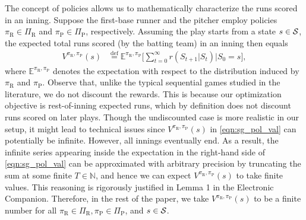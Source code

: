 \documentclass[opre,dblanonrev]{informs4}
\newcommand{\defeq}{\stackrel{\text{def}}{=}}
\begin{document}
    The concept of policies allows us to mathematically characterize the runs scored in an inning. Suppose the first-base runner and the pitcher employ policies $\pi_\text{R} \in \Pi_\text{R}$ and $\pi_\text{P} \in \Pi_\text{P}$, respectively. Assuming the play starts from a state $s \in {\cal S}$, the expected total runs scored (by the batting team) in an inning then equals 
    \begin{align}
       \label{eqn:sg_pol_val}
       V^{\pi_\text{R},\pi_\text{P}}(s) &\defeq \mathbb{E}^{\pi_\text{R},\pi_\text{P}}\Bigg[\sum_{t=0}^\infty r(S_{t+1}|S_t) \Big| S_0 = s\Bigg], 
   \end{align}
  where $\mathbb{E}^{\pi_\text{R},\pi_\text{P}}$ denotes the expectation with respect to the distribution induced by $\pi_\text{R}$ and $\pi_{\text{P}}$. Observe that, unlike the typical sequential games studied in the literature, we do not discount the rewards. This is because our optimization objective is rest-of-inning expected runs, which by definition does not discount runs scored on later plays. Though the undiscounted case is more realistic in our setup, it might lead to technical issues since $V^{\pi_\text{R},\pi_\text{P}}(s)$ in \eqref{eqn:sg_pol_val} can potentially be infinite. However, all innings eventually end. As a result, the infinite series appearing inside the expectation in the right-hand side of \eqref{eqn:sg_pol_val} can be approximated with arbitrary precision by truncating the sum at some finite $T \in \mathbb{N}$, and hence we can expect $V^{\pi_\text{R},\pi_\text{P}}(s)$ to take finite values. This reasoning is rigorously justified in Lemma 1 in the Electronic Companion. Therefore, in the rest of the paper, we take $V^{\pi_\text{R},\pi_\text{P}}(s)$ to be a finite number for all $\pi_\text{R} \in \Pi_\text{R}, \pi_\text{P} \in \Pi_\text{P}$, and $s \in {\cal S}$. 
   
\end{document}
